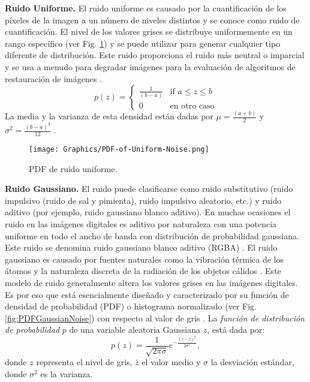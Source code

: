\textbf{Ruido Uniforme.}
El ruido uniforme es causado por la cuantificación de los píxeles de la imagen a un número de niveles distintos y se conoce como ruido de cuantificación. El nivel de los valores grises se distribuye uniformemente en un rango específico (ver Fig. \ref{fig:PDFUniformNoise}) y se puede utilizar para generar cualquier tipo diferente de distribución. Este ruido proporciona el ruido más neutral o imparcial y se usa a menudo para degradar imágenes para la evaluación de algoritmos de restauración de imágenes \cite{HaidiTheamSin}.
$$
p(z) = \left\{
    \begin{array}{ll}
        \frac{1}{(b-a)} & \mbox{if } a \leq z \leq b \\
        0  & \mbox{en otro caso}
    \end{array}
    \right.
$$
La media y la varianza de esta densidad están dadas por $\mu = \frac{(a+b)}{2}$ y $\sigma^2 = \frac{(b-a)^2}{12}$ \cite{MandarMeghana}.\\
    
\begin{figure}[h!]
    \centering
    \texttt{[image: Graphics/PDF-of-Uniform-Noise.png]}
    \caption{PDF de ruido uniforme.}
    \label{fig:PDFUniformNoise}
\end{figure}

\textbf{Ruido Gaussiano.}
El ruido puede clasificarse como ruido substitutivo (ruido impulsivo (ruido de sal y pimienta), ruido impulsivo aleatorio, etc.) y ruido aditivo (por ejemplo, ruido gaussiano blanco aditivo). En muchas ocasiones el ruido en las imágenes digitales es aditivo por naturaleza con una potencia uniforme en todo el ancho de banda con distribución de probabilidad gaussiana. Este ruido se denomina ruido gaussiano blanco aditivo (RGBA) \cite{MandarMeghana}. El ruido gaussiano es causado por fuentes naturales como la vibración térmica de los átomos y la naturaleza discreta de la radiación de los objetos cálidos \cite{AjayBrijendra2}. Este modelo de ruido generalmente altera los valores grises en las imágenes digitales. Es por eso que está esencialmente diseñado y caracterizado por su función de densidad de probabilidad (PDF) o histograma normalizado (ver Fig. \ref{fig:PDFGaussianNoise}) con respecto al valor de gris \cite{AjayBrijendra}. La \textit{función de distribución de probabilidad} $p$ de una variable aleatoria Gaussiana $z$, está dada por:
$$p(z) = \frac{1}{\sqrt{2\pi\sigma}}e^{-\frac{(z-\bar{z})^2}{2\sigma^2}},$$
donde $z$ representa el nivel de gris, $\bar{z}$ el valor medio y $\sigma$ la desviación estándar, donde $\sigma^2$ es la varianza.

